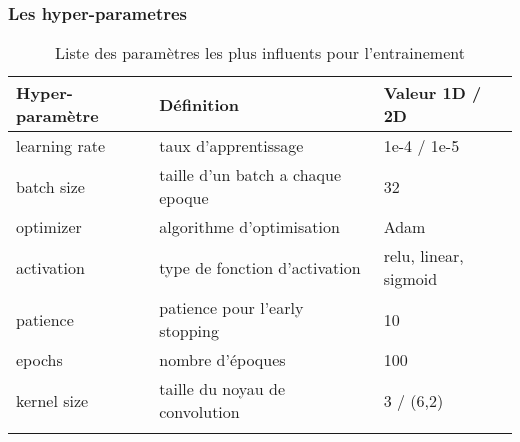 \begin{frame}
    \frametitle{Les hyper-parametres}

    \begin{table}[h!]
        \scriptsize
        \caption{Liste des paramètres les plus influents pour l'entrainement}
        \label{tab:Parametres}
        \centering
        \begin{tabular}{l l l}
        \toprule
        \textbf{Hyper-paramètre} & \textbf{Définition} & \textbf{Valeur 1D / 2D} \\
        \midrule
        learning rate & taux d'apprentissage & 1e-4 / 1e-5\\
        batch size & taille d'un batch a chaque epoque & 32\\
        optimizer & algorithme d'optimisation & Adam\\
        activation & type de fonction d'activation  & relu, linear, sigmoid\\
        patience & patience pour l'early stopping & 10\\
        epochs & nombre d'époques & 100\\
        kernel size & taille du noyau de convolution & 3 / (6,2)\\
        \bottomrule\\
        \end{tabular}
    \end{table}

\end{frame}



% 
